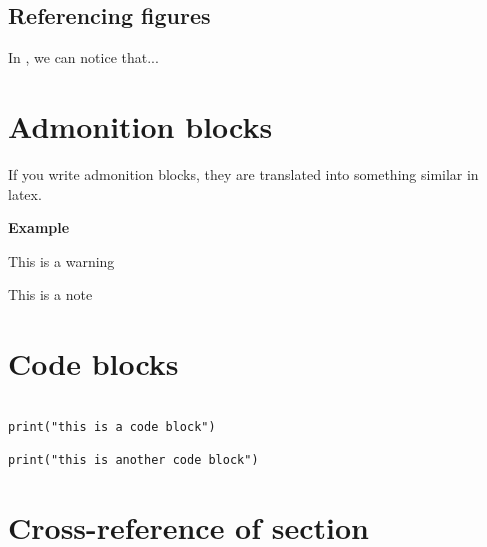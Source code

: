 \documentclass{doc_class_fontsize}{extarticle}
\begin{document}






\subsection{Referencing figures}

In , we can notice that...





\section{Admonition blocks}

If you write admonition blocks, they are translated into something similar in latex.

\textbf{Example}

\begin{tcolorbox}[width=1.0\textwidth,colback={red},title={warning},outer arc=0mm,colupper=white]

This is a warning

\end{tcolorbox}



\begin{tcolorbox}[width=1.0\textwidth,colback={white},title={note},outer arc=0mm,colupper=black]

This is a note

\end{tcolorbox}





\section{Code blocks}

\begin{verbatim}

print("this is a code block")

print("this is another code block")

\end{verbatim}



\section{Cross-reference of section}
\end{document}
